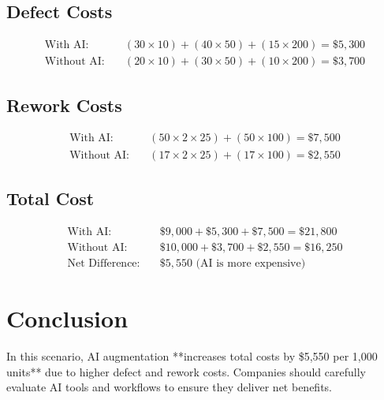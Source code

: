 \documentclass{article}
\begin{document}
\subsection{Defect Costs}
\begin{align*}
\text{With AI:} & \quad (30 \times 10) + (40 \times 50) + (15 \times 200) = \boxed{\$5,300} \\
\text{Without AI:} & \quad (20 \times 10) + (30 \times 50) + (10 \times 200) = \boxed{\$3,700}
\end{align*}

\subsection{Rework Costs}
\begin{align*}
\text{With AI:} & \quad (50 \times 2 \times 25) + (50 \times 100) = \boxed{\$7,500} \\
\text{Without AI:} & \quad (17 \times 2 \times 25) + (17 \times 100) = \boxed{\$2,550}
\end{align*}

\subsection{Total Cost}
\begin{align*}
\text{With AI:} & \quad \$9,000 + \$5,300 + \$7,500 = \boxed{\$21,800} \\
\text{Without AI:} & \quad \$10,000 + \$3,700 + \$2,550 = \boxed{\$16,250} \\
\text{Net Difference:} & \quad \boxed{\$5,550} \text{ (AI is more expensive)}
\end{align*}

\section{Conclusion}
In this scenario, AI augmentation **increases total costs by \$5,550 per 1,000 units** due to higher defect and rework costs. Companies should carefully evaluate AI tools and workflows to ensure they deliver net benefits.
\end{document}
